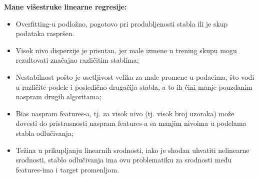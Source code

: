 \documentclass[fontsize=12bp, paper=a4]{scrarticle}
\begin{document}
\textbf{Mane višestruke linearne regresije:}
\begin{itemize}
\item Overfitting-u podložno, pogotovo pri produbljenosti stabla ili je skup podataka raspršen.
\item Visok nivo disperzije je prisutan, jer male izmene u trening skupu mogu rezultovati značajno različitim stablima;
\item Nestabilnost pošto je osetljivost velika za male promene u podacima, što vodi u različite podele i posledično drugačija stabla, a to ih čini manje pouzdanim naspram drugih algoritama;
\item Bias naspram features-a, tj. za visok nivo (tj. visok broj uzoraka) može dovesti do pristrasnosti naspram features-a sa manjim nivoima u podelama stabla odlučivanja;
\item Težina u prikupljanju linearnih srodnosti, iako je shodan uhvatiti nelinearne srodnosti, stablo odlučivanja ima ovu problematiku za srodnosti među features-ima i target promenljom. 
\end{itemize}

\end{document}
